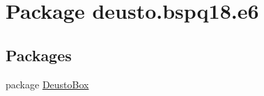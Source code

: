 \hypertarget{namespacedeusto_1_1bspq18_1_1e6}{}\section{Package deusto.\+bspq18.\+e6}
\label{namespacedeusto_1_1bspq18_1_1e6}
\subsection*{Packages}
\begin{DoxyCompactItemize}
\item 
package \mbox{\hyperlink{namespacedeusto_1_1bspq18_1_1e6_1_1_deusto_box}{Deusto\+Box}}
\end{DoxyCompactItemize}
